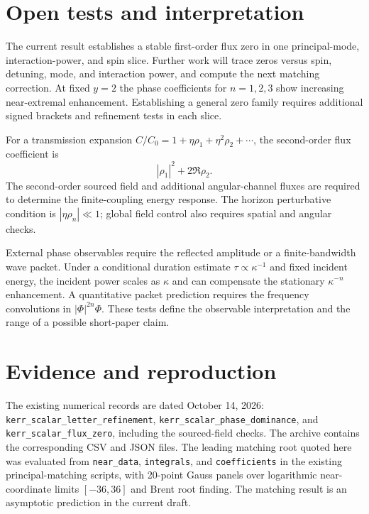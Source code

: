 \documentclass[aps,prd,twocolumn,10pt,nofootinbib,superscriptaddress,floatfix]{revtex4-2}
\begin{document}
\section{Open tests and interpretation}\label{sec:next}
The current result establishes a stable first-order flux zero in one
principal-mode, interaction-power, and spin slice.
Further work will trace zeros versus spin, detuning, mode, and interaction
power, and compute the next matching correction.
At fixed $y=2$ the phase coefficients for $n=1,2,3$ show increasing
near-extremal enhancement. Establishing a general zero family requires
additional signed brackets and refinement tests in each slice.

For a transmission expansion $C/C_0=1+\eta\rho_1+\eta^2\rho_2+\cdots$,
the second-order flux coefficient is
\begin{equation}
|\rho_1|^2+2\Re\rho_2.
\end{equation}
The second-order sourced field and additional angular-channel fluxes
are required to determine the finite-coupling energy response.
The horizon perturbative condition is $|\eta\rho_n|\ll1$;
global field control also requires spatial and angular checks.

External phase observables require the reflected amplitude or a
finite-bandwidth wave packet. Under a conditional duration estimate
$\tau\propto\kappa^{-1}$ and fixed incident energy, the incident
power scales as $\kappa$ and can compensate the stationary
$\kappa^{-n}$ enhancement. A quantitative packet prediction requires
the frequency convolutions in $|\Phi|^{2n}\Phi$.
These tests define the observable interpretation and the range of a
possible short-paper claim.

\appendix
\section{Evidence and reproduction}
The existing numerical records are dated October 14, 2026:
\texttt{kerr\_scalar\_letter\_refinement},
\texttt{kerr\_scalar\_phase\_dominance}, and
\texttt{kerr\_scalar\_flux\_zero}, including the sourced-field checks.
The archive contains the corresponding CSV and JSON files.
The leading matching root quoted here was evaluated from
\texttt{near\_data}, \texttt{integrals}, and \texttt{coefficients}
in the existing principal-matching scripts, with 20-point Gauss panels
over logarithmic near-coordinate limits $[-36,36]$ and Brent root finding.
The matching result is an asymptotic prediction in the current draft.
\end{document}
